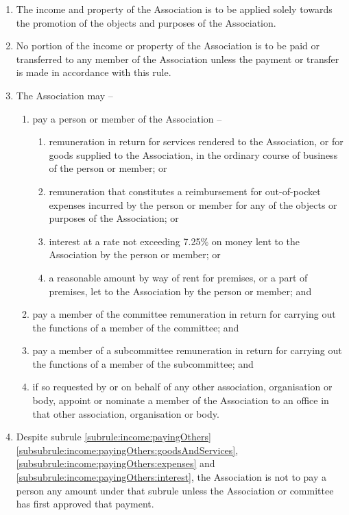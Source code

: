 \documentclass[a4paper,11pt]{article}
\begin{document}
\begin{enumerate}
	\item The income and property of the Association is to be applied solely towards the promotion of the objects and purposes of the Association.
	\item No portion of the income or property of the Association is to be paid or transferred to any member of the Association unless the payment or transfer is made in accordance with this rule.
	
	\item \label{subrule:income:payingOthers} The Association may --
	\begin{enumerate}
		\item pay a person or member of the Association --
		\begin{enumerate}
			\item \label{subsubrule:income:payingOthers:goodsAndServices} remuneration in return for services rendered to the Association, or for goods supplied to the Association, in the ordinary course of business of the person or member; or
			\item \label{subsubrule:income:payingOthers:expenses} remuneration that constitutes a reimbursement for out-of-pocket expenses incurred by the person or member for any of the objects or purposes of the Association; or
			\item \label{subsubrule:income:payingOthers:interest} interest at a rate not exceeding 7.25\% on money lent to the Association by the person or member; or
			\item \label{subsubrule:income:payingOthers:rent} a reasonable amount by way of rent for premises, or a part of premises, let to the Association by the person or member; and
		\end{enumerate}
		
		\item pay a member of the committee remuneration in return for carrying out the functions of a member of the committee; and
		\item pay a member of a subcommittee remuneration in return for carrying out the functions of a member of the subcommittee; and
		\item if so requested by or on behalf of any other association, organisation or body, appoint or nominate a member of the Association to an office in that other association, organisation or body.
	\end{enumerate}
	
	\item Despite subrule \ref{subrule:income:payingOthers}\ref{subsubrule:income:payingOthers:goodsAndServices}, \ref{subsubrule:income:payingOthers:expenses} and \ref{subsubrule:income:payingOthers:interest}, the Association is not to pay a person any amount under that subrule unless the Association or committee has first approved that payment.


\end{enumerate}
\end{document}
